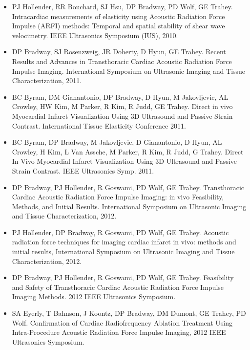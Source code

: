 \documentclass[letterpaper,10pt,english]{sphinxmanual}
\begin{document}
\begin{itemize}
\item {} 
PJ Hollender, RR Bouchard, SJ Hsu, DP Bradway, PD Wolf, GE Trahey.
Intracardiac measurements of elasticity using Acoustic Radiation
Force Impulse (ARFI) methods: Temporal and spatial stability of shear
wave velocimetry. IEEE Ultrasonics Symposium (IUS), 2010.

\item {} 
DP Bradway, SJ Rosenzweig, JR Doherty, D Hyun, GE Trahey. Recent
Results and Advances in Transthoracic Cardiac Acoustic Radiation
Force Impulse Imaging. International Symposium on Ultrasonic Imaging
and Tissue Characterization, 2011.

\item {} 
BC Byram, DM Gianantonio, DP Bradway, D Hyun, M Jakovljevic, AL
Crowley, HW Kim, M Parker, R Kim, R Judd, GE Trahey. Direct in vivo
Myocardial Infarct Visualization Using 3D Ultrasound and Passive
Strain Contrast. International Tissue Elasticity Conference 2011.

\item {} 
BC Byram, DP Bradway, M Jakovljevic, D Gianantonio, D Hyun, AL
Crowley, H Kim, L Van Assche, M Parker, R Kim, R Judd, G Trahey.
Direct In Vivo Myocardial Infarct Visualization Using 3D Ultrasound
and Passive Strain Contrast. IEEE Ultrasonics Symp. 2011.

\item {} 
DP Bradway, PJ Hollender, R Goswami, PD Wolf, GE Trahey.
Transthoracic Cardiac Acoustic Radiation Force Impulse Imaging: in
vivo Feasibility, Methods, and Initial Results. International
Symposium on Ultrasonic Imaging and Tissue Characterization, 2012.

\item {} 
PJ Hollender, DP Bradway, R Goswami, PD Wolf, GE Trahey. Acoustic
radiation force techniques for imaging cardiac infarct in vivo:
methods and initial results, International Symposium on Ultrasonic
Imaging and Tissue Characterization, 2012.

\item {} 
DP Bradway, PJ Hollender, R Goswami, PD Wolf, GE Trahey. Feasibility
and Safety of Transthoracic Cardiac Acoustic Radiation Force Impulse
Imaging Methods. 2012 IEEE Ultrasonics Symposium.

\item {} 
SA Eyerly, T Bahnson, J Koontz, DP Bradway, DM Dumont, GE Trahey, PD
Wolf. Confirmation of Cardiac Radiofrequency Ablation Treatment Using
Intra-Procedure Acoustic Radiation Force Impulse Imaging, 2012 IEEE
Ultrasonics Symposium.


\end{itemize}
\end{document}
